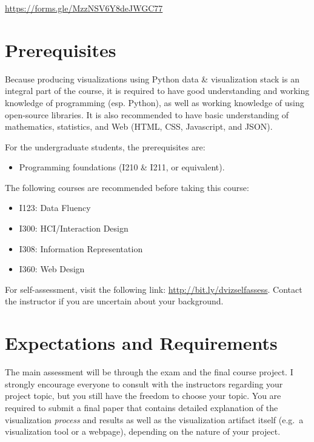 \documentclass[11pt,article,oneside]{memoir} %
\begin{document}
\url{https://forms.gle/MzzNSV6Y8deJWGC77} 

\section{Prerequisites}%
\label{sec:Prerequisites}

Because producing visualizations using Python data \& visualization stack is an integral part of the course, it is required to have good understanding and working knowledge of programming (esp. Python), as well as working knowledge of using open-source libraries. 
It is also recommended to have basic understanding of mathematics, statistics, and Web (HTML, CSS, Javascript, and JSON). 

For the undergraduate students, the prerequisites are:
%
\begin{itemize}\vspace{-10pt}
%
\item Programming foundations (I210 \& I211, or equivalent). 
%
\end{itemize}
%
The following courses are recommended before taking this course: 
%
\begin{itemize}\vspace{-10pt}
%
\item I123: Data Fluency \item I300: HCI/Interaction Design \item I308:
Information Representation \item I360: Web Design
%
\end{itemize}

For self-assessment, visit the following link: \href{http://bit.ly/dvizselfassess}{http://bit.ly/dvizselfassess}. 
Contact the instructor if you are uncertain about your background. 

\section{Expectations and Requirements}%
\label{sec:requirements}

The main assessment will be through the exam and the final course project. 
I strongly encourage everyone to consult with the instructors regarding your project topic, but you still have the freedom to choose your topic.
You are required to submit a final paper that contains detailed explanation of the visualization \emph{process} and results as well as the visualization artifact itself (e.g.~a visualization tool or a webpage), depending on the nature of your project. 
\end{document}
